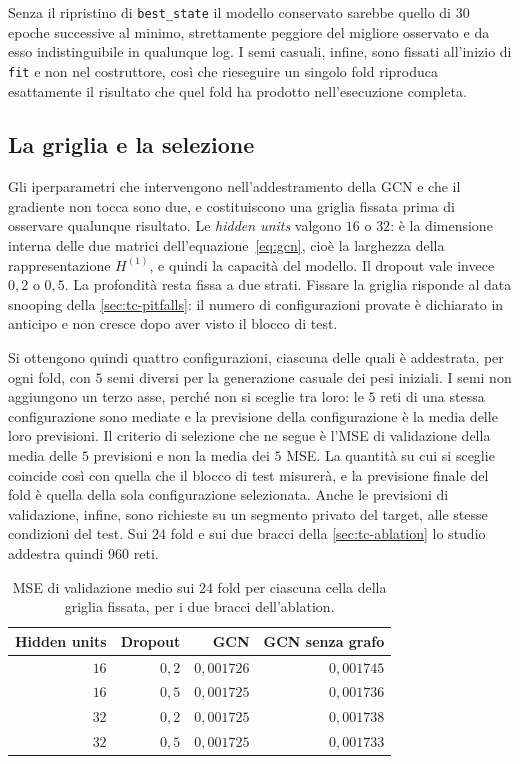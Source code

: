 Senza il ripristino di \texttt{best\_state} il modello conservato sarebbe quello di $30$ epoche successive al minimo, strettamente peggiore del migliore osservato e da esso indistinguibile in qualunque log. I semi casuali, infine, sono fissati all'inizio di \texttt{fit} e non nel costruttore, così che rieseguire un singolo fold riproduca esattamente il risultato che quel fold ha prodotto nell'esecuzione completa.

\subsection{La griglia e la selezione}

Gli iperparametri che intervengono nell'addestramento della GCN e che il gradiente non tocca sono due, e costituiscono una griglia fissata prima di osservare qualunque risultato. Le \emph{hidden units} valgono $16$ o $32$: è la dimensione interna delle due matrici dell'equazione~\eqref{eq:gcn}, cioè la larghezza della rappresentazione $H^{(1)}$, e quindi la capacità del modello. Il dropout vale invece $0{,}2$ o $0{,}5$. La profondità resta fissa a due strati. Fissare la griglia risponde al data snooping della \cref{sec:tc-pitfalls}: il numero di configurazioni provate è dichiarato in anticipo e non cresce dopo aver visto il blocco di test.

Si ottengono quindi quattro configurazioni, ciascuna delle quali è addestrata, per ogni fold, con $5$ semi diversi per la generazione casuale dei pesi iniziali. I semi non aggiungono un terzo asse, perché non si sceglie tra loro: le $5$ reti di una stessa configurazione sono mediate e la previsione della configurazione è la media delle loro previsioni. Il criterio di selezione che ne segue è l'MSE di validazione della media delle $5$ previsioni e non la media dei $5$ MSE. La quantità su cui si sceglie coincide così con quella che il blocco di test misurerà, e la previsione finale del fold è quella della sola configurazione selezionata. Anche le previsioni di validazione, infine, sono richieste su un segmento privato del target, alle stesse condizioni del test. Sui $24$ fold e sui due bracci della \cref{sec:tc-ablation} lo studio addestra quindi $960$ reti.

\begin{table}[H]
\centering
\caption[MSE di validazione sulla griglia GCN]{MSE di validazione medio sui $24$ fold per ciascuna cella della griglia fissata, per i due bracci dell'ablation.}
\label{tab:tc-gcn-grid}
\small
\begin{tabular*}{\textwidth}{@{\extracolsep{\fill}}rrrr@{}}
\toprule
\textbf{Hidden units} & \textbf{Dropout} & \textbf{GCN} & \textbf{GCN senza grafo} \\
\midrule
$16$ & $0{,}2$ & $0{,}001726$ & $0{,}001745$ \\
$16$ & $0{,}5$ & $0{,}001725$ & $0{,}001736$ \\
$32$ & $0{,}2$ & $0{,}001725$ & $0{,}001738$ \\
$32$ & $0{,}5$ & $0{,}001725$ & $0{,}001733$ \\
\bottomrule
\end{tabular*}
\end{table}

